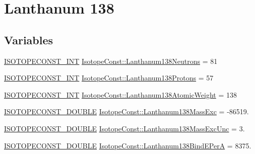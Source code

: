 \hypertarget{group___isotope_const-_lanthanum-_la138}{}\section{Lanthanum 138}
\label{group___isotope_const-_lanthanum-_la138}
\subsection*{Variables}
\begin{DoxyCompactItemize}
\item 
\mbox{\hyperlink{group___isotope_const-_macros_ga5f18360b3e99483a35c32d789e62621c}{I\+S\+O\+T\+O\+P\+E\+C\+O\+N\+S\+T\+\_\+\+I\+NT}} \mbox{\hyperlink{group___isotope_const-_lanthanum-_la138_gaa078f03b2e07837caf8a7bef1edd6a16}{Isotope\+Const\+::\+Lanthanum138\+Neutrons}} = 81
\item 
\mbox{\hyperlink{group___isotope_const-_macros_ga5f18360b3e99483a35c32d789e62621c}{I\+S\+O\+T\+O\+P\+E\+C\+O\+N\+S\+T\+\_\+\+I\+NT}} \mbox{\hyperlink{group___isotope_const-_lanthanum-_la138_gabcad7ac3a0679087c5219be8dbaa887d}{Isotope\+Const\+::\+Lanthanum138\+Protons}} = 57
\item 
\mbox{\hyperlink{group___isotope_const-_macros_ga5f18360b3e99483a35c32d789e62621c}{I\+S\+O\+T\+O\+P\+E\+C\+O\+N\+S\+T\+\_\+\+I\+NT}} \mbox{\hyperlink{group___isotope_const-_lanthanum-_la138_ga8363591938dfe0b6f43c17dceb32dbc7}{Isotope\+Const\+::\+Lanthanum138\+Atomic\+Weight}} = 138
\item 
\mbox{\hyperlink{group___isotope_const-_macros_ga8f45a7272ce02c0b4c65c44636ed719a}{I\+S\+O\+T\+O\+P\+E\+C\+O\+N\+S\+T\+\_\+\+D\+O\+U\+B\+LE}} \mbox{\hyperlink{group___isotope_const-_lanthanum-_la138_ga0bfe6d09caffcc559af2a3da66c2ea41}{Isotope\+Const\+::\+Lanthanum138\+Mass\+Exc}} = -\/86519.
\item 
\mbox{\hyperlink{group___isotope_const-_macros_ga8f45a7272ce02c0b4c65c44636ed719a}{I\+S\+O\+T\+O\+P\+E\+C\+O\+N\+S\+T\+\_\+\+D\+O\+U\+B\+LE}} \mbox{\hyperlink{group___isotope_const-_lanthanum-_la138_ga0f67d56d12c8f5c3745788f576de4422}{Isotope\+Const\+::\+Lanthanum138\+Mass\+Exc\+Unc}} = 3.
\item 
\mbox{\hyperlink{group___isotope_const-_macros_ga8f45a7272ce02c0b4c65c44636ed719a}{I\+S\+O\+T\+O\+P\+E\+C\+O\+N\+S\+T\+\_\+\+D\+O\+U\+B\+LE}} \mbox{\hyperlink{group___isotope_const-_lanthanum-_la138_gae9806f1094da8b00cb8bf6e2cf27a16b}{Isotope\+Const\+::\+Lanthanum138\+Bind\+E\+PerA}} = 8375.
\item 

\end{DoxyCompactItemize}
